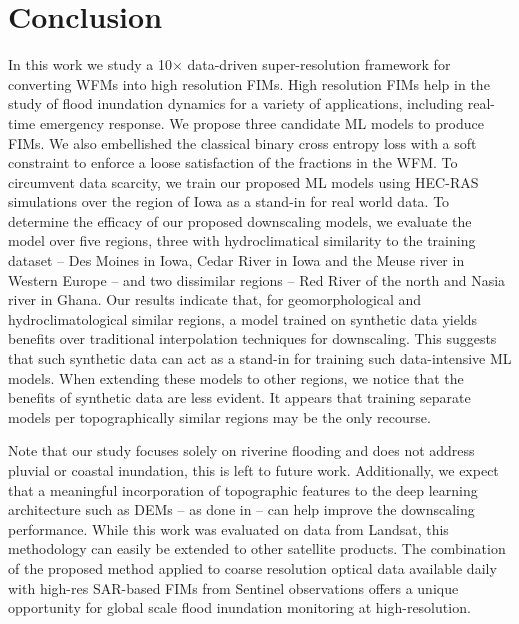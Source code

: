 \section{Conclusion}
In this work we study a 10$\times$ data-driven super-resolution framework for converting \acp{WFM} into high resolution \acp{FIM}. High resolution \acp{FIM} help in the study of flood inundation dynamics for a variety of applications, including real-time
emergency response. We propose three candidate ML models to produce \acp{FIM}. 
We also embellished the classical binary cross entropy loss with a soft constraint to enforce a loose satisfaction of the fractions in the \ac{WFM}. 
To circumvent data scarcity, we train our proposed ML models using HEC-RAS simulations over the region of Iowa as a stand-in for real world data. To determine the efficacy of our proposed downscaling models, we evaluate the model over five regions, three with hydroclimatical similarity to the training dataset -- Des Moines in Iowa, Cedar River in Iowa and the Meuse river in Western Europe -- and two dissimilar regions -- Red River of the north and Nasia river in Ghana. Our results indicate that, for geomorphological and hydroclimatological similar regions, a model trained on synthetic data yields benefits over traditional interpolation techniques for downscaling. This suggests that such synthetic data can act as a stand-in for training such data-intensive ML models. 
When extending these models to other regions, we notice that the benefits of synthetic data are less evident. It appears that training separate models per topographically similar regions may be the only recourse. 

Note that our study focuses solely on riverine flooding and does not address pluvial or coastal  inundation, this is left to future work. Additionally, we expect that a meaningful incorporation of topographic features to the deep learning architecture such as \acp{DEM} -- as done in \cite{Li2022VIIRSDownscaling} -- can help improve the downscaling performance. While this work was evaluated on data from Landsat, this methodology can easily be extended to other satellite products. The combination of the proposed method applied to coarse resolution optical data available daily with high-res SAR-based \acp{FIM} from Sentinel observations offers a unique opportunity for global scale flood inundation monitoring at high-resolution.
